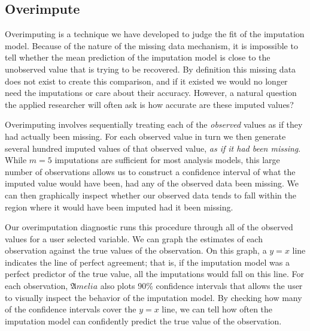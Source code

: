 \documentclass[12pt,titlepage]{article}
\newcommand{\Amelia}{\ensuremath{\mathfrak Amelia} }
\begin{document}
\subsection{Overimpute}
\label{sec:overimpute}
Overimputing is a technique we have developed to judge the fit of the
imputation model.  Because of the nature of the missing data
mechanism, it is impossible to tell whether the mean prediction of the
imputation model is close to the unobserved value that is trying to be
recovered.  By definition this missing data does not exist to create
this comparison, and if it existed we would no longer need the
imputations or care about their accuracy.  However, a natural question
the applied researcher will often ask is how accurate are these
imputed values?

Overimputing involves sequentially treating each of the
\emph{observed} values as if they had actually been missing.  For each
observed value in turn we then generate several hundred imputed values
of that observed value, \emph{as if it had been missing}.  While $m=5$
imputations are sufficient for most analysis models, this large number
of observations allows us to construct a confidence interval of what
the imputed value would have been, had any of the observed data been
missing.  We can then graphically inspect whether our observed data
tends to fall within the region where it would have been imputed had
it been missing.


Our overimputation diagnostic runs this procedure through all of the
observed values for a user selected variable.  We can graph the
estimates of each observation against the true values of the
observation.  On this graph, a $y=x$ line indicates the line of
perfect agreement; that is, if the imputation model was a perfect
predictor of the true value, all the imputations would fall on this
line.  For each observation, \Amelia also plots 90\% confidence
intervals that allows the user to visually inspect the behavior of the
imputation model. By checking how many of the confidence intervals
cover the $y=x$ line, we can tell how often the imputation model can
confidently predict the true value of the observation.
\end{document}
